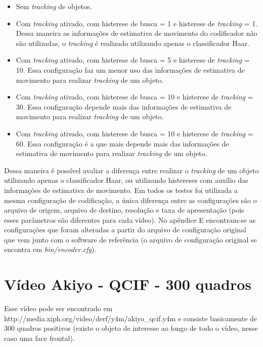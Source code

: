 \begin{itemize}
        \item Sem \textit{tracking} de objetos.

	\item Com \textit{tracking} ativado, com histerese de busca = 1 e histerese de \textit{tracking} = 1. Dessa maneira as informações de estimativa de movimento do codificador não são utilizadas, o \textit{tracking} é realizado utilizando apenas o classificador Haar.

	\item Com \textit{tracking} ativado, com histerese de busca = 5 e histerese de \textit{tracking} = 10. Essa configuração faz um menor uso das informações de estimativa de movimento para realizar \textit{tracking} de um objeto.

         \item Com \textit{tracking} ativado, com histerese de busca = 10 e histerese de \textit{tracking} = 30. Essa configuração depende mais das informações de estimativa de movimento para realizar \textit{tracking} de um objeto.

         \item Com \textit{tracking} ativado, com histerese de busca = 10 e histerese de \textit{tracking} = 60. Essa configuração é a que mais depende mais das informações de estimativa de movimento para realizar \textit{tracking} de um objeto.
\end{itemize}


Dessa maneira é possível avaliar a diferença entre realizar o \textit{tracking} de um objeto utilizando apenas o classificador Haar, ou utilizando histereses com auxílio das informações de estimativa de movimento. Em todos os testes foi utilizada a mesma configuração de codificação, a única diferença entre as configurações são o arquivo de origem, arquivo de destino, resolução e taxa de apresentação (pois esses parâmetros são diferentes para cada vídeo). No apêndice E encontram-se as configurações que foram alteradas a partir do arquivo de configuração original que vem junto com o software de referência (o arquivo de configuração original se encontra em \textit{bin/encoder.cfg}).


\section{ Vídeo Akiyo - QCIF - 300 quadros }


Esse vídeo pode ser encontrado em http://media.xiph.org/video/derf/y4m/akiyo\_qcif.y4m e consiste basicamente de 300 quadros positivos (existe o objeto de interesse ao longo de todo o vídeo, nesse caso uma face frontal).


